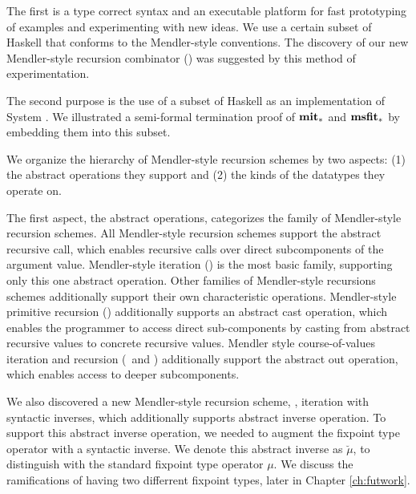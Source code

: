The first is a type correct syntax and an executable platform for
fast prototyping of examples and experimenting with new ideas. We use a certain
subset of Haskell that conforms to the Mendler-style conventions.
The discovery of our new Mendler-style recursion combinator (\MsfIt)
was suggested by this method of experimentation.

The second purpose is the use of a subset of Haskell as
an implementation of System \Fw. We illustrated a semi-formal termination proof of
$\mathbf{mit}_{*}$ and $\mathbf{msfit}_{*}$ by embedding them into this subset.

We organize the hierarchy of Mendler-style recursion schemes
by two aspects: (1) the abstract operations they support and
(2) the kinds of the datatypes they operate on.

The first aspect, the abstract operations, categorizes the family
of Mendler-style recursion schemes. All Mendler-style recursion schemes
support the abstract recursive call, which enables recursive
calls over direct subcomponents of the argument value.
Mendler-style iteration (\MIt) is the most basic family,
supporting only this one abstract operation. Other
families of Mendler-style recursions schemes additionally support
their own characteristic operations. Mendler-style primitive recursion (\MPr)
additionally supports an abstract cast operation, which enables the programmer
to access direct sub-components by casting from abstract recursive values to
concrete recursive values. Mendler style course-of-values iteration and
recursion (\McvIt\ and \McvPr) additionally support the abstract out
operation, which enables access to deeper subcomponents. 

We also discovered
a new Mendler-style recursion scheme, \MsfIt, iteration with syntactic inverses,
which additionally supports abstract inverse operation. To support
this abstract inverse operation, we needed to augment the fixpoint type operator
with a syntactic inverse. We denote this abstract inverse as $\breve{\mu}$,
to distinguish with the standard fixpoint type operator $\mu$. We discuss
the ramifications of having two differrent fixpoint types, later in
Chapter \ref{ch:futwork}.

